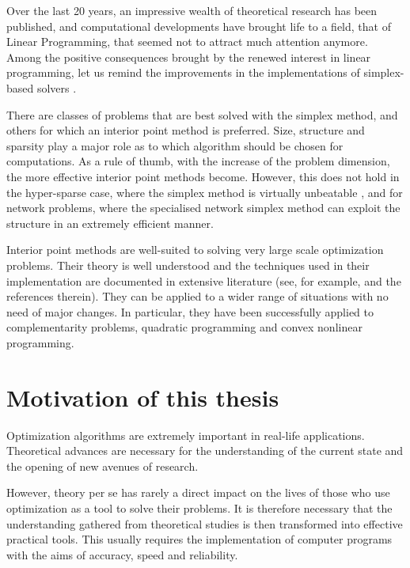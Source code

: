 Over the last 20 years, an impressive wealth of theoretical research
has been published, and computational developments have brought life
to a field, that of Linear Programming, that seemed not to attract much
attention anymore.
Among the positive consequences brought by the renewed interest in linear
programming, let us remind the improvements in the implementations of 
simplex-based solvers \cite{Bixby94,Bixby02}.

There are classes of problems that are best solved with the simplex
method, and others for which an interior point method is preferred.
Size, structure and sparsity play a major role as to which
algorithm should be chosen for computations.
As a rule of thumb, with the increase of the problem dimension, the 
more effective interior point methods become.
However, this does not hold in the hyper-sparse case, where the
simplex method is virtually unbeatable \cite{Bixby02,HallMcKinnon05}, 
and for network problems,
where the specialised network simplex method can exploit the
structure in an extremely efficient manner.

Interior point methods are well-suited to solving very
large scale optimization problems. Their theory is well understood
\cite{ipm:Wright97} and the techniques used in their implementation 
are documented in extensive literature (see, for example, 
\cite{AndersenGondzioMeszarosXu,GondzioTerlaky} and the references therein).
They can be applied to a wider range of situations with no need
of major changes. In particular, they have been successfully applied to
complementarity problems, quadratic programming and convex 
nonlinear programming.


%
%
\section{Motivation of this thesis}

Optimization algorithms are extremely important in real-life 
applications. Theoretical advances are necessary for the 
understanding of the current state and the opening of new avenues 
of research. 

However, theory per se has rarely a direct impact on the lives 
of those who use optimization as a tool to solve their problems.
It is therefore necessary that the understanding gathered from
theoretical studies is then transformed into effective practical
tools. This usually requires the implementation of computer programs
with the aims of accuracy, speed and reliability.

